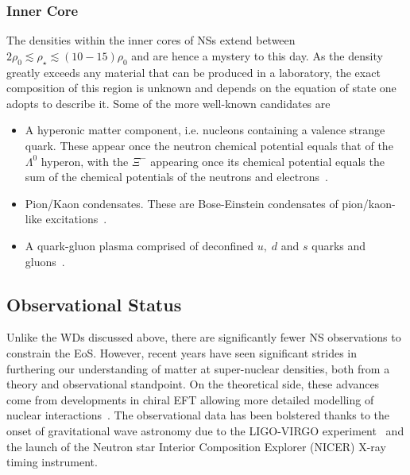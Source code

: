 \subsubsection*{Inner Core}
The densities within the inner cores of NSs extend between $2\rho_0 \lesssim \rho_\star \lesssim (10-15)\rho_0$ and are hence a mystery to this day. As the density greatly exceeds any material that can be produced in a laboratory, the exact composition of this region is unknown and depends on the equation of state one adopts to describe it. Some of the more well-known candidates are
\begin{itemize}
    \item A hyperonic  matter component, i.e. nucleons containing a valence strange quark. These appear once the neutron chemical potential equals that of the $\Lambda^0$ hyperon, with the $\Xi^-$ appearing once its chemical potential equals the sum of the chemical potentials of the neutrons and electrons~\cite{Weber:2007ch_may_NeutronStarInteriors,Fortin:2014mya_Neutronstarshyperon}. 
    \item Pion/Kaon condensates. These are Bose-Einstein condensates of pion/kaon-like excitations~\cite{Baym:1973zk_Pioncondensationnuclear,Baym:1974vzp_Pioncondensationneutron,Kaplan:1986yq_StrangeGoingsDense, Ellis:1995kz_Kaoncondensationneutron, Brown:1992ib_Novelmechanismkaon, Ma:2022fmu_jan_Kaonmesoncondensate}. 
    \item A quark-gluon plasma comprised of deconfined $u,\; d$ and $s$ quarks and gluons~\cite{Akmal:1998cf_Equationstatenucleon,Baym:2006rq_Neutronstarsquark,Baym:2017whm_Hadronsquarksneutron}.
\end{itemize}


\subsection{Observational Status}
\label{ch2:subsec:NS_obs}

Unlike the WDs discussed above, there are significantly fewer NS observations to constrain the EoS. However, recent years have seen significant strides in furthering our understanding of matter at super-nuclear densities, both from a theory and observational standpoint. On the theoretical side, these advances come from developments in chiral EFT allowing more detailed modelling of nuclear interactions~\cite{Hebeler:2009iv_Chiralthreenucleonforces, Tews:2012fj_jan_NeutronMatterNexttoNexttoNexttoLeading, Tews:2018kmu_jun_Constrainingspeedsound}. The observational data has been bolstered thanks to the onset of gravitational wave astronomy due to the LIGO-VIRGO experiment~\cite{LIGOScientific:2017zic_Gravitationalwavesgammarays, LIGOScientific:2018cki_oct_GW170817MeasurementsNeutron, LIGOScientific:2018hze_Propertiesbinaryneutron} and the launch of the Neutron star Interior Composition Explorer (NICER) X-ray timing instrument. 

